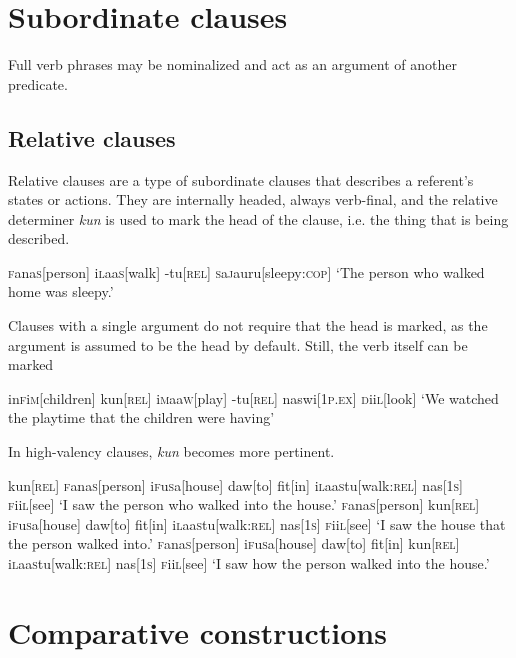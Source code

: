 \documentclass[a4paper,10pt,twoside,openright]{memoir}
\newcommand{\famword}[5]{#1\textsc{#2}#3\textsc{#4}#5}
\begin{document}
\section{Subordinate clauses}

Full verb phrases may be nominalized and act as an argument of another predicate.

\subsection{Relative clauses}

Relative clauses are a type of subordinate clauses that describes a referent's states or actions. They are internally headed, always verb-final, and the relative determiner \emph{kun} is used to mark the head of the clause, i.e. the thing that is being described.

\ex
\begingl
\famword{}{f}{ana}{s}{}[person]
\famword{i}{l}{aa}{s}{}[walk]
-tu[\textsc{rel}]
\famword{}{s}{a}{j}{a}uru[sleepy:\textsc{cop}]
\glft `The person who walked home was sleepy.'
\endgl
\xe

Clauses with a single argument do not require that the head is marked, as the argument is assumed to be the head by default. Still, the verb itself can be marked

\ex
\begingl
\famword{in}{f}{i}{m}{}[children]
kun[\textsc{rel}]
\famword{i}{m}{aa}{w}{}[play]
-tu[\textsc{rel}]
naswi[\textsc{1p.ex}]
\famword{}{d}{ii}{l}{}[look]
\glft `We watched the playtime that the children were having'
\endgl
\xe

In high-valency clauses, \emph{kun} becomes more pertinent. 

\pex[interpartskip=3ex]
\a
\begingl
kun[\textsc{rel}]
\famword{}{f}{ana}{s}{}[person]
\famword{i}{f}{u}{s}{a}[house]
daw[to]
fit[in]
\famword{i}{l}{aa}{s}{}tu[walk\textsc{:rel}]
nas[\textsc{1s}]
\famword{}{f}{ii}{l}{}[see]
\glft `I saw the person who walked into the house.'
\endgl
\a
\begingl
\famword{}{f}{ana}{s}{}[person]
kun[\textsc{rel}]
\famword{i}{f}{u}{s}{a}[house]
daw[to]
fit[in]
\famword{i}{l}{aa}{s}{}tu[walk\textsc{:rel}]
nas[\textsc{1s}]
\famword{}{f}{ii}{l}{}[see]
\glft `I saw the house that the person walked into.'
\endgl
\a
\begingl
\famword{}{f}{ana}{s}{}[person]
\famword{i}{f}{u}{s}{a}[house]
daw[to]
fit[in]
kun[\textsc{rel}]
\famword{i}{l}{aa}{s}{}tu[walk\textsc{:rel}]
nas[\textsc{1s}]
\famword{}{f}{ii}{l}{}[see]
\glft `I saw how the person walked into the house.'
\endgl
\xe


\section{Comparative constructions}
\end{document}
